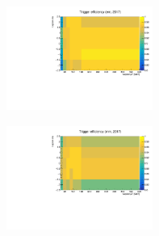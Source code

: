 \documentclass[a4paper, 10pt, openright]{report}
\begin{document}
\begin{figure}[htbp]
\begin{center}
{\begin{minipage}[b]{.32\textwidth}
\begin{center}
\end{center}
\end{minipage} \hfill
\begin{minipage}[b]{.32\textwidth}
\begin{center}
\includegraphics[width=4.8cm, height=3.8cm]{figs/triggEff_2017_em.pdf}
\end{center}
\end{minipage} \hfill
\begin{minipage}[b]{.32\textwidth}
\begin{center}
\includegraphics[width=4.8cm, height=3.8cm]{figs/triggEff_2017_mm.pdf}
\end{center}
\end{minipage}
}
\end{center}
\end{figure}
\end{document}

